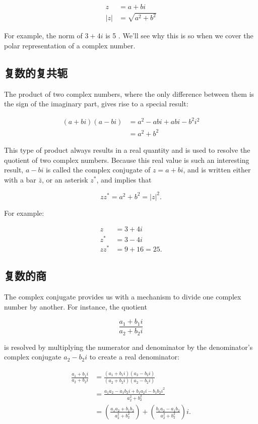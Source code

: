$$
\begin{aligned}
z & =a+b i \\
|z| & =\sqrt{a^{2}+b^{2}}
\end{aligned}
$$

For example, the norm of $3+4 i$ is 5 . We'll see why this is so when we cover the polar representation of a complex number.

\subsection{复数的复共轭}
The product of two complex numbers, where the only difference between them is the sign of the imaginary part, gives rise to a special result:

$$
\begin{aligned}
(a+b i)(a-b i) & =a^{2}-a b i+a b i-b^{2} i^{2} \\
& =a^{2}+b^{2}
\end{aligned}
$$

This type of product always results in a real quantity and is used to resolve the quotient of two complex numbers. Because this real value is such an interesting result, $a-b i$ is called the complex conjugate of $z=a+b i$, and is written either with a bar $\bar{z}$, or an asterisk $z^{*}$, and implies that

$$
z z^{*}=a^{2}+b^{2}=|z|^{2} .
$$

For example:

$$
\begin{aligned}
z & =3+4 i \\
z^{*} & =3-4 i \\
z z^{*} & =9+16=25 .
\end{aligned}
$$

\subsection{复数的商}
The complex conjugate provides us with a mechanism to divide one complex number by another. For instance, the quotient

$$
\frac{a_{1}+b_{1} i}{a_{2}+b_{2} i}
$$

is resolved by multiplying the numerator and denominator by the denominator's complex conjugate $a_{2}-b_{2} i$ to create a real denominator:

$$
\begin{aligned}
\frac{a_{1}+b_{1} i}{a_{2}+b_{2} i} & =\frac{\left(a_{1}+b_{1} i\right)\left(a_{2}-b_{2} i\right)}{\left(a_{2}+b_{2} i\right)\left(a_{2}-b_{2} i\right)} \\
& =\frac{a_{1} a_{2}-a_{1} b_{2} i+b_{1} a_{2} i-b_{1} b_{2} i^{2}}{a_{2}^{2}+b_{2}^{2}} \\
& =\left(\frac{a_{1} a_{2}+b_{1} b_{2}}{a_{2}^{2}+b_{2}^{2}}\right)+\left(\frac{b_{1} a_{2}-a_{1} b_{2}}{a_{2}^{2}+b_{2}^{2}}\right) i .
\end{aligned}
$$

